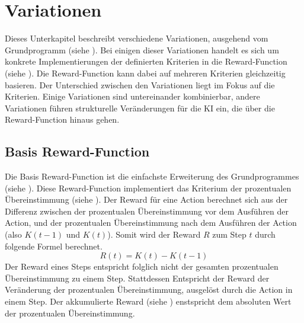  
\section{Variationen}\label{chap:m_var}
Dieses Unterkapitel beschreibt verschiedene Variationen, ausgehend vom
Grundprogramm (siehe ). Bei einigen dieser Variationen
handelt es sich um konkrete Implementierungen der definierten Kriterien in die
Reward-Function (siehe ). Die Reward-Function kann
dabei auf mehreren Kriterien gleichzeitig basieren. Der Unterschied zwischen den
Variationen liegt im Fokus auf die Kriterien. Einige Variationen sind
untereinander kombinierbar, andere Variationen führen strukturelle Veränderungen
für die KI ein, die über die Reward-Function hinaus gehen.
 
\subsection{Basis Reward-Function}\label{sub:m_var_base}
Die Basis Reward-Function ist die einfachste Erweiterung des Grundprogrammes
(siehe ). Diese Reward-Function implementiert das
Kriterium der prozentualen Übereinstimmung (siehe ).
Der Reward für eine Action berechnet sich aus der Differenz zwischen der
prozentualen Übereinstimmung vor dem Ausführen der Action, und der prozentualen
Übereinstimmung nach dem Ausführen der Action (also $K(t-1)$ und $K(t)$). Somit
wird der Reward $R$ zum Step $t$ durch folgende Formel berechnet.
\[ R(t) = K(t) - K(t-1) \] Der Reward eines Steps entspricht folglich nicht der
gesamten prozentualen Übereinstimmung zu einem Step. Stattdessen Entspricht der
Reward der Veränderung der prozentualen Übereinstimmung, ausgelöst durch die
Action in einem Step. Der akkumulierte Reward (siehe )
enstspricht dem absoluten Wert der prozentualen Übereinstimmung.
 
 
